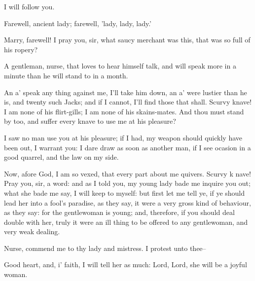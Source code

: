 \begin{speech}
I will follow you.
\end{speech}
\begin{speech}
Farewell, ancient lady;   farewell, 'lady, lady, lady.'
\end{speech}
\begin{speech}
Marry, farewell! I pray you, sir,
what saucy merchant was this, that was so full
of his ropery?
\end{speech}
\begin{speech}
A gentleman, nurse, that loves to
hear himself talk, and will speak more in a
minute than he will stand to in a month.
\end{speech}
\begin{speech}
An a' speak any thing against me,
I'll take him down, an a' were lustier than he
is, and twenty such Jacks; and if I cannot,
I'll find those that shall. Scurvy knave! I
am none of his flirt-gills; I am none of his
skains-mates.  And thou must stand by too,
and suffer every knave to use me at his pleasure?
\end{speech}
\begin{speech}
I saw no man use you at his pleasure;
if I had, my weapon should quickly have
been out, I warrant you: I dare draw as soon
as another man, if I see ocasion in a good
quarrel, and the law on my side.
\end{speech}
\begin{speech}
Now, afore God, I am so vexed,
that every part about me quivers.  Scurvy k
nave!  Pray you, sir, a word: and as I told
you, my young lady bade me inquire you out;
what she bade me say, I will keep to myself:
but first let me tell ye, if ye should lead her
into a fool's paradise, as they say, it were a
very gross kind of behaviour, as they say: for
the gentlewoman is young; and, therefore, if
you should deal double with her, truly it were
an ill thing to be offered to any gentlewoman,
and very weak dealing.
\end{speech}
\begin{speech}
Nurse, commend me to thy lady and
mistress. I protest unto thee--
\end{speech}
\begin{speech}
Good heart, and, i' faith, I will tell
her as much: Lord, Lord, she will be a joyful
woman.
\end{speech}
